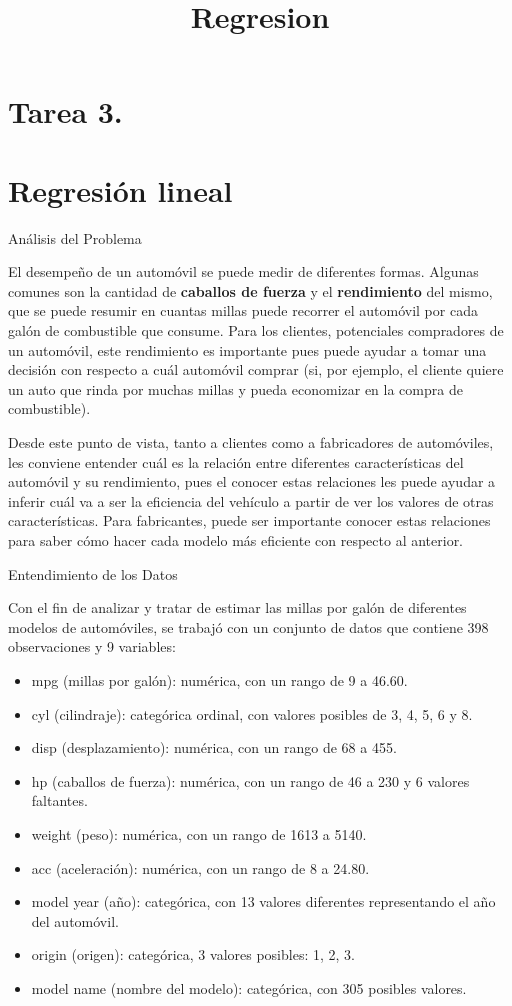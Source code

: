 \documentclass[]{article}
\title{Regresion}
\author{}
\date{}
\providecommand{\tightlist}{%
  \setlength{\itemsep}{0pt}\setlength{\parskip}{0pt}}
\begin{document}
\maketitle

\section{Tarea 3.}\label{tarea-3.}

\section{Regresión lineal}\label{regresion-lineal}

Análisis del Problema

El desempeño de un automóvil se puede medir de diferentes formas.
Algunas comunes son la cantidad de \textbf{caballos de fuerza} y el
\textbf{rendimiento} del mismo, que se puede resumir en cuantas millas
puede recorrer el automóvil por cada galón de combustible que consume.
Para los clientes, potenciales compradores de un automóvil, este
rendimiento es importante pues puede ayudar a tomar una decisión con
respecto a cuál automóvil comprar (si, por ejemplo, el cliente quiere un
auto que rinda por muchas millas y pueda economizar en la compra de
combustible).

Desde este punto de vista, tanto a clientes como a fabricadores de
automóviles, les conviene entender cuál es la relación entre diferentes
características del automóvil y su rendimiento, pues el conocer estas
relaciones les puede ayudar a inferir cuál va a ser la eficiencia del
vehículo a partir de ver los valores de otras características. Para
fabricantes, puede ser importante conocer estas relaciones para saber
cómo hacer cada modelo más eficiente con respecto al anterior.

Entendimiento de los Datos

Con el fin de analizar y tratar de estimar las millas por galón de
diferentes modelos de automóviles, se trabajó con un conjunto de datos
que contiene 398 observaciones y 9 variables:

\begin{itemize}
\tightlist
\item
  mpg (millas por galón): numérica, con un rango de 9 a 46.60.
\item
  cyl (cilindraje): categórica ordinal, con valores posibles de 3, 4, 5,
  6 y 8.
\item
  disp (desplazamiento): numérica, con un rango de 68 a 455.
\item
  hp (caballos de fuerza): numérica, con un rango de 46 a 230 y 6
  valores faltantes.
\item
  weight (peso): numérica, con un rango de 1613 a 5140.
\item
  acc (aceleración): numérica, con un rango de 8 a 24.80.
\item
  model year (año): categórica, con 13 valores diferentes representando
  el año del automóvil.
\item
  origin (origen): categórica, 3 valores posibles: 1, 2, 3.
\item
  model name (nombre del modelo): categórica, con 305 posibles valores.
\end{itemize}
\end{document}

